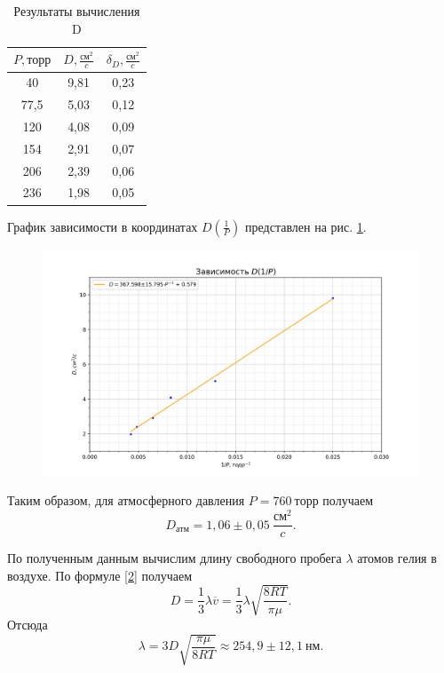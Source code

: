 \documentclass[a4paper, 12pt]{article}
\begin{document}
\begin{table}[h!]
\renewcommand{\arraystretch}{1.5}
\begin{center}
\begin{tabular}{|c|c|c|}
\hline 
$P, торр$ & $D, \frac{см^2}{c}$ & $\delta_{D}, \frac{см^2}{c}$ \\ 
\hline 
40 & 9,81 & 0,23 \\ 
\hline 
77,5 & 5,03 & 0,12 \\ 
\hline 
120 & 4,08 & 0,09 \\ 
\hline 
154 & 2,91 & 0,07 \\ 
\hline 
206 & 2,39 & 0,06 \\ 
\hline 
236 & 1,98 & 0,05 \\ 
\hline 
\end{tabular}
\caption{Результаты вычисления D}
\label{tab2}
\end{center}
\end{table}

График зависимости в координатах $D(\frac{1}{P})$ представлен на рис. \ref{ris7}.

\begin{figure}[h!]
\begin{flushleft}
    \includegraphics[scale=0.75]{2.2.1_2.png}
\end{flushleft}
\caption{}
\label{ris7}
\end{figure}

Таким образом, для атмосферного давления $P = 760~торр$ получаем
\[\boxed{D_{атм} = 1,06\pm0,05~\frac{см^2}{c}}.\]

По полученным данным вычислим длину свободного пробега $\lambda$ атомов гелия в воздухе. По формуле \eqref{2} получаем
\begin{equation}\label{molek1}
D = \frac{1}{3}\lambda\overline{v} = \frac{1}{3}\lambda\sqrt{\frac{8RT}{\pi\mu}}.
\end{equation}
Отсюда
\begin{equation}\label{molek2}
\boxed{\lambda = 3D\sqrt{\frac{\pi\mu}{8RT}} \approx 254,9\pm12,1~нм}.
\end{equation}
\end{document}
